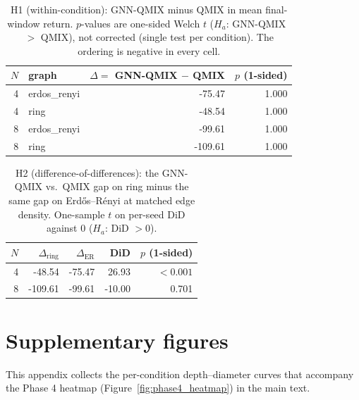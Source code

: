 \documentclass[manuscript, screen, review]{jair}
\newcommand{\algoname}[1]{\textsc{#1}}
\newcommand{\qmix}{\algoname{QMIX}}
\newcommand{\gnnqmix}{\algoname{GNN-QMIX}}
\begin{document}
\begin{table}[!ht]
  \centering
  \small
  \caption{H1 (within-condition): GNN-QMIX minus QMIX in mean final-window
  return. $p$-values are one-sided Welch $t$ ($H_a$: \gnnqmix\ $>$ \qmix),
  not corrected (single test per condition). The ordering is negative in
  every cell.}
  \label{tab:phase2_h1}
  \begin{tabular}{rlrr}
    \toprule
    $N$ & graph & $\Delta = $ GNN-QMIX $-$ QMIX & $p$ (1-sided) \\
    \midrule
    4 & erdos\_renyi & -75.47 & 1.000 \\
4 & ring & -48.54 & 1.000 \\
8 & erdos\_renyi & -99.61 & 1.000 \\
8 & ring & -109.61 & 1.000 \\
    \bottomrule
  \end{tabular}
\end{table}

\begin{table}[!ht]
  \centering
  \small
  \caption{H2 (difference-of-differences): the GNN-QMIX vs.\ QMIX gap on
  ring minus the same gap on Erd\H{o}s--R\'enyi at matched edge density.
  One-sample $t$ on per-seed DiD against 0 ($H_a$: DiD $> 0$).}
  \label{tab:phase2_h2}
  \begin{tabular}{rrrrr}
    \toprule
    $N$ & $\Delta_{\text{ring}}$ & $\Delta_{\text{ER}}$ & DiD & $p$ (1-sided) \\
    \midrule
    4 & -48.54 & -75.47 & 26.93 & $<0.001$ \\
8 & -109.61 & -99.61 & -10.00 & 0.701 \\
    \bottomrule
  \end{tabular}
\end{table}

\section{Supplementary figures}
\label{app:figures}

This appendix collects the per-condition depth--diameter curves that
accompany the Phase 4 heatmap (Figure~\ref{fig:phase4_heatmap}) in the main
text.
\end{document}
